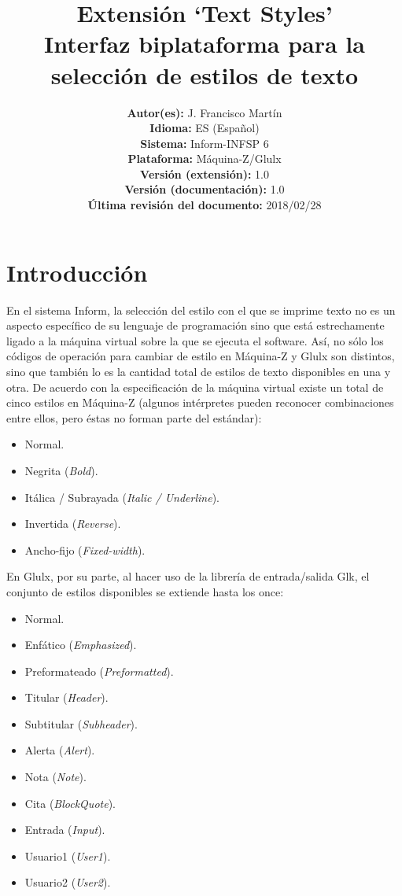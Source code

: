 \documentclass[a4paper,12pt]{article}
\title{\vspace{-3cm}Extensión `Text Styles' \\
    \Large{Interfaz biplataforma para la selección de estilos de texto}}
\author{
	\small{\textbf{Autor(es):} J. Francisco Martín}\\
	\small{\textbf{Idioma:} ES (Español)}\\
	\small{\textbf{Sistema:} Inform-INFSP 6}\\
	\small{\textbf{Plataforma:} Máquina-Z/Glulx}\\
	\small{\textbf{Versión (extensión):} 1.0}\\
	\small{\textbf{Versión (documentación):} 1.0}\\
	\small{\textbf{Última revisión del documento:} 2018/02/28}
}
\date{}
\numberwithin{equation}{section}
\begin{document}
\maketitle


\section{Introducción} \label{sec:introduccion}

En el sistema Inform, la selección del estilo con el que se imprime texto no es un aspecto específico de su lenguaje de programación sino que está estrechamente ligado a la máquina virtual sobre la que se ejecuta el software. Así, no sólo los códigos de operación para cambiar de estilo en Máquina-Z y Glulx son distintos, sino que también lo es la cantidad total de estilos de texto disponibles en una y otra. De acuerdo con la especificación de la máquina virtual existe un total de cinco estilos en Máquina-Z\cite{NF14} (algunos intérpretes pueden reconocer combinaciones entre ellos, pero éstas no forman parte del estándar):

\begin{itemize}
	\item Normal.
	\item Negrita (\emph{Bold}).
	\item Itálica / Subrayada (\emph{Italic / Underline}).
	\item Invertida (\emph{Reverse}).
	\item Ancho-fijo (\emph{Fixed-width}).
\end{itemize}

En Glulx, por su parte, al hacer uso de la librería de entrada/salida Glk, el conjunto de estilos disponibles se extiende hasta los once\cite{PLO17}:

\begin{itemize}
	\item Normal.
	\item Enfático (\emph{Emphasized}).
	\item Preformateado (\emph{Preformatted}).
	\item Titular (\emph{Header}).
	\item Subtitular (\emph{Subheader}).
	\item Alerta (\emph{Alert}).
	\item Nota (\emph{Note}).
	\item Cita (\emph{BlockQuote}).
	\item Entrada (\emph{Input}).
	\item Usuario1 (\emph{User1}).
	\item Usuario2 (\emph{User2}).
\end{itemize}
\end{document}
